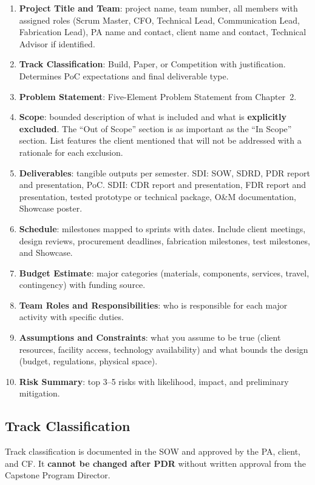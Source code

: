 \begin{enumerate}[nosep,leftmargin=1.5em]
\item \textbf{Project Title and Team}: project name, team number, all members with assigned roles (Scrum Master, CFO, Technical Lead, Communication Lead, Fabrication Lead), PA name and contact, client name and contact, Technical Advisor if identified.
\item \textbf{Track Classification}: Build, Paper, or Competition with justification. Determines PoC expectations and final deliverable type.
\item \textbf{Problem Statement}: Five-Element Problem Statement from Chapter~2.
\item \textbf{Scope}: bounded description of what is included and what is \textbf{explicitly excluded}. The ``Out of Scope'' section is as important as the ``In Scope'' section. List features the client mentioned that will not be addressed with a rationale for each exclusion.
\item \textbf{Deliverables}: tangible outputs per semester. SDI: SOW, SDRD, PDR report and presentation, PoC. SDII: CDR report and presentation, FDR report and presentation, tested prototype or technical package, O\&M documentation, Showcase poster.
\item \textbf{Schedule}: milestones mapped to sprints with dates. Include client meetings, design reviews, procurement deadlines, fabrication milestones, test milestones, and Showcase.
\item \textbf{Budget Estimate}: major categories (materials, components, services, travel, contingency) with funding source.
\item \textbf{Team Roles and Responsibilities}: who is responsible for each major activity with specific duties.
\item \textbf{Assumptions and Constraints}: what you assume to be true (client resources, facility access, technology availability) and what bounds the design (budget, regulations, physical space).
\item \textbf{Risk Summary}: top 3--5 risks with likelihood, impact, and preliminary mitigation.
\end{enumerate}

\subsection{Track Classification}
Track classification is documented in the SOW and approved by the PA, client, and CF. It \textbf{cannot be changed after PDR} without written approval from the Capstone Program Director.

